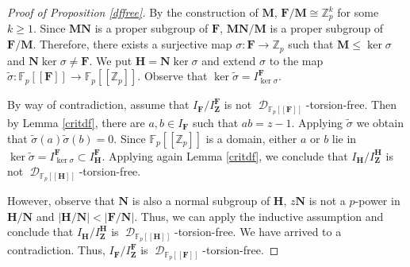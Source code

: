 \documentclass[11pt]{amsart}
\numberwithin{claimcounter}{lem}
\DeclareMathOperator{\D}{\mathcal D}
\newcommand{\Z}{\mathbb{Z}}
\newcommand{\F}{\mathbb{F}}
\begin{document}
\begin{proof}[Proof of Proposition \ref{dffree}]
By the construction of $ \mathbf  M$, $\mathbf F/\mathbf M\cong \Z_p^k$ for some $k\ge 1$.  Since $\mathbf M\mathbf N$ 
is a proper subgroup of $\mathbf F$,
  $\mathbf M\mathbf N/\mathbf M$ is a proper subgroup of $\mathbf F/\mathbf M$. Therefore, there exists a surjective map
  $\sigma:\mathbf F\to \Z_p$   such that $\mathbf M\le \ker \sigma$ and $\mathbf N\ker \sigma\ne \mathbf F$. We put $\mathbf H=\mathbf N\ker \sigma$ and 
 extend $\sigma$  to the map $\widetilde \sigma:\F_p[[\mathbf F]]\to \F_p[[\Z_p]]$. Observe that $\ker \widetilde \sigma=I_{\ker \sigma}^\mathbf F$.
 
By way of contradiction, assume that $I_{\mathbf F}/I_\mathbf Z^{\mathbf F}$ is not $\D_{\F_p[[\mathbf F]]}$-torsion-free. Then by Lemma \ref{critdf}, there are $a,b\in I_{\mathbf F}$ such that $ab=z-1$. Applying $\widetilde \sigma$ we obtain that $\widetilde \sigma (a)\widetilde \sigma(b)=0$. Since $ \F_p[[\Z_p]]$ is a domain, either $a$ or $b$ lie in $\ker \widetilde \sigma=I_{\ker \sigma}^\mathbf F\subset I_\mathbf H^{\mathbf F}$. Applying again Lemma \ref{critdf}, we conclude that $I_\mathbf H/I_\mathbf Z^\mathbf H$ is not $\D_{\F_p[[\mathbf H]]}$-torsion-free.  

However, observe that $\mathbf N$ is also a normal subgroup of $\mathbf H$, $z\mathbf N$ is not a $p$-power in $\mathbf H/\mathbf N$ 
and $|\mathbf H/\mathbf N|< |\mathbf F/\mathbf N|$. Thus, we can apply the inductive assumption and conclude that $I_\mathbf H/I_\mathbf Z^\mathbf H$ is
  $\D_{\F_p[[\mathbf H]]}$-torsion-free.  We have arrived to a contradiction. Thus,  $I_{\mathbf F}/I_\mathbf Z^{\mathbf F}$ is  $\D_{\F_p[[\mathbf F]]}$-torsion-free. \end{proof}
\end{document}
